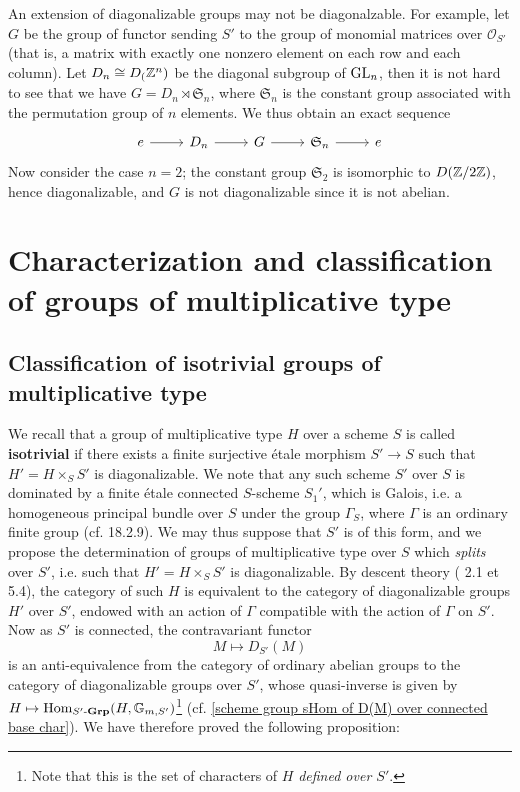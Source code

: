 \begin{example}
An extension of diagonalizable groups may not be diagonalzable. For example, let $G$ be the group of functor sending $S'$ to the group of monomial matrices over $\mathscr{O}_{S'}$ (that is, a matrix with exactly one nonzero element on each row and each column). Let $D_n\cong D_(\mathbb{Z}^n)$ be the diagonal subgroup of $\mathrm{GL}_n$, then it is not hard to see that we have $G=D_n\rtimes\mathfrak{S}_n$, where $\mathfrak{S}_n$ is the constant group associated with the permutation group of $n$ elements. We thus obtain an exact sequence
\[\begin{tikzcd}
e\ar[r]&D_n\ar[r]&G\ar[r]&\mathfrak{S}_n\ar[r]&e
\end{tikzcd}\]
Now consider the case $n=2$; the constant group $\mathfrak{S}_2$ is isomorphic to $D(\mathbb{Z}/2\mathbb{Z})$, hence diagonalizable, and $G$ is not diagonalizable since it is not abelian.
\end{example}

\section{Characterization and classification of groups of multiplicative type}
\subsection{Classification of isotrivial groups of multiplicative type}
We recall that a group of multiplicative type $H$ over a scheme $S$ is called \textbf{isotrivial} if there exists a finite surjective \'etale morphism $S'\to S$ such that $H'=H\times_SS'$ is diagonalizable. We note that any such scheme $S'$ over $S$ is dominated by a finite \'etale connected $S$-scheme $S_1'$, which is Galois, i.e. a homogeneous principal bundle over $S$ under the group $\Gamma_S$, where $\Gamma$ is an ordinary finite group (cf. \cite{EGA4-4} 18.2.9). We may thus suppose that $S'$ is of this form, and we propose the determination of groups of multiplicative type over $S$ which \textit{splits} over $S'$, i.e. such that $H'=H\times_SS'$ is diagonalizable. By descent theory (\cite{SGA1}  2.1 et 5.4), the category of such $H$ is equivalent to the category of diagonalizable groups $H'$ over $S'$, endowed with an action of $\Gamma$ compatible with the action of $\Gamma$ on $S'$. Now as $S'$ is connected, the contravariant functor
\[M\mapsto D_{S'}(M)\]
is an anti-equivalence from the category of ordinary abelian groups to the category of diagonalizable groups over $S'$, whose quasi-inverse is given by $H\mapsto\mathrm{Hom}_{S'\textup{-}\mathbf{Grp}}(H,\mathbb{G}_{m,S'})$\footnote{Note that this is the set of characters of $H$ \textit{defined over $S'$}.} (cf. \cref{scheme group sHom of D(M) over connected base char}). We have therefore proved the following proposition:

